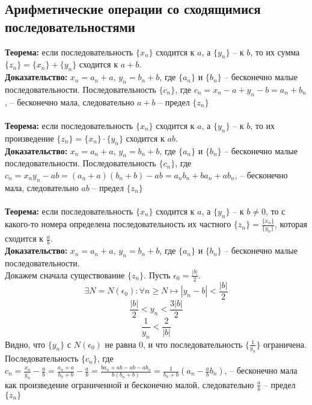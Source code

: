 \documentclass{article}
\begin{document}
    \subsection*{Арифметические операции со сходящимися последовательностями}
        \textbf{Теорема:} если последовательность $\{x_n\}$ сходится к $a$, а $\{y_n\}$ -- к $b$, то их сумма $\{z_n\} = \{x_n\} + \{y_n\}$ сходится к $a + b$.
        \\
        \textbf{Доказательство:}
        $x_n = a_n + a$, $y_n = b_n + b$, где $\{a_n\}$ и $\{b_n\}$ -- бесконечно малые последовательности.
        Последовательность $\{c_n\}$, где $c_n = x_n - a + y_n - b = a_n + b_n$, -- бесконечно мала, следовательно
        $a + b$ -- предел $\{z_n\}$
        \\
        \\
        \textbf{Теорема:} если последовательность $\{x_n\}$ сходится к $a$, а $\{y_n\}$ -- к $b$, то их произведение $\{z_n\} = \{x_n\} \cdot \{y_n\}$ сходится к $ab$.
        \\
        \textbf{Доказательство:}
        $x_n = a_n + a$, $y_n = b_n + b$, где $\{a_n\}$ и $\{b_n\}$ -- бесконечно малые последовательности.
        Последовательность $\{c_n\}$, где $c_n = x_n y_n - ab = (a_n + a) (b_n + b) - ab = a_n b_n + b a_n + a b_n $, -- бесконечно мала, следовательно
        $ab$ -- предел $\{z_n\}$
        \\
        \\
        \textbf{Теорема:} если последовательность $\{x_n\}$ сходится к $a$, а $\{y_n\}$ -- к $b \neq 0$, то с какого-то номера
        определена последовательность их частного $\{z_n\} = \frac{\{x_n\}}{\{y_n\}}$, которая сходится к $\frac{a}{b}$.    
        \\
        \textbf{Доказательство:}
        $x_n = a_n + a$, $y_n = b_n + b$, где $\{a_n\}$ и $\{b_n\}$ -- бесконечно малые последовательности.
        \\
        Докажем сначала существование $\{z_n\}$. Пусть $\epsilon_0 = \frac{|b|}{2}$.
        \[ \exists N = N(\epsilon_0): \forall n \ge N \longmapsto |y_n - b| < \frac{|b|}{2} \]
        \[ \frac{|b|}{2} < y_n < \frac{3|b|}{2} \]
        \[ \frac{1}{y_n} < \frac{2}{|b|} \]
        Видно, что $\{y_n\}$ с $N(\epsilon_0)$ не равна $0$, и что последовательность $\{\frac{1}{y_n}\}$ ограничена.
        \\
        Последовательность $\{c_n\}$, где $c_n = \frac{x_n}{y_n} - \frac{a}{b} = \frac{a_n + a}{b_n + b} - \frac{a}{b} =
        \frac{b a_n + ab - ab - a b_n}{b(b_n + b)} = \frac{1}{b_n + b}(a_n - \frac{a}{b} b_n)$, -- бесконечно мала как произведение ограниченной
        и бесконечно малой, следовательно $\frac{a}{b}$ -- предел $\{z_n\}$
    
\end{document}
